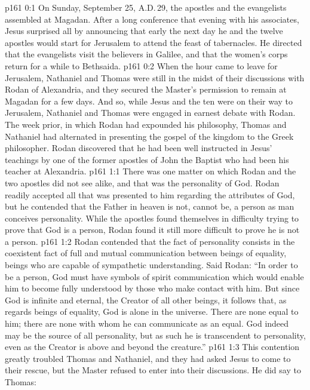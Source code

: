 \author{Midwayer Commission}
\vs p161 0:1 On Sunday, September 25, A.D.\,29, the apostles and the evangelists assembled at Magadan. After a long conference that evening with his associates, Jesus surprised all by announcing that early the next day he and the twelve apostles would start for Jerusalem to attend the feast of tabernacles. He directed that the evangelists visit the believers in Galilee, and that the women’s corps return for a while to Bethsaida.
\vs p161 0:2 When the hour came to leave for Jerusalem, Nathaniel and Thomas were still in the midst of their discussions with Rodan of Alexandria, and they secured the Master’s permission to remain at Magadan for a few days. And so, while Jesus and the ten were on their way to Jerusalem, Nathaniel and Thomas were engaged in earnest debate with Rodan. The week prior, in which Rodan had expounded his philosophy, Thomas and Nathaniel had alternated in presenting the gospel of the kingdom to the Greek philosopher. Rodan discovered that he had been well instructed in Jesus’ teachings by one of the former apostles of John the Baptist who had been his teacher at Alexandria.
\vs p161 1:1 There was one matter on which Rodan and the two apostles did not see alike, and that was the personality of God. Rodan readily accepted all that was presented to him regarding the attributes of God, but he contended that the Father in heaven is not, cannot be, a person as man conceives personality. While the apostles found themselves in difficulty trying to prove that God is a person, Rodan found it still more difficult to prove he is not a person.
\vs p161 1:2 Rodan contended that the fact of personality consists in the coexistent fact of full and mutual communication between beings of equality, beings who are capable of sympathetic understanding. Said Rodan: “In order to be a person, God must have symbols of spirit communication which would enable him to become fully understood by those who make contact with him. But since God is infinite and eternal, the Creator of all other beings, it follows that, as regards beings of equality, God is alone in the universe. There are none equal to him; there are none with whom he can communicate as an equal. God indeed may be the source of all personality, but as such he is transcendent to personality, even as the Creator is above and beyond the creature.”
\vs p161 1:3 This contention greatly troubled Thomas and Nathaniel, and they had asked Jesus to come to their rescue, but the Master refused to enter into their discussions. He did say to Thomas: 
